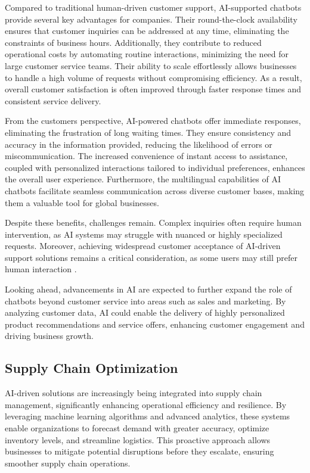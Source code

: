 Compared to traditional human-driven customer support, AI-supported chatbots provide several key advantages for companies. Their round-the-clock availability ensures that customer inquiries can be addressed at any time, eliminating the constraints of business hours. Additionally, they contribute to reduced operational costs by automating routine interactions, minimizing the need for large customer service teams. Their ability to scale effortlessly allows businesses to handle a high volume of requests without compromising efficiency. As a result, overall customer satisfaction is often improved through faster response times and consistent service delivery.  

From the customers perspective, AI-powered chatbots offer immediate responses, eliminating the frustration of long waiting times. They ensure consistency and accuracy in the information provided, reducing the likelihood of errors or miscommunication. The increased convenience of instant access to assistance, coupled with personalized interactions tailored to individual preferences, enhances the overall user experience. Furthermore, the multilingual capabilities of AI chatbots facilitate seamless communication across diverse customer bases, making them a valuable tool for global businesses.  

Despite these benefits, challenges remain. Complex inquiries often require human intervention, as AI systems may struggle with nuanced or highly specialized requests. Moreover, achieving widespread customer acceptance of AI-driven support solutions remains a critical consideration, as some users may still prefer human interaction \cite{Customer-Service-AI-Chatbots}.  

Looking ahead, advancements in AI are expected to further expand the role of chatbots beyond customer service into areas such as sales and marketing. By analyzing customer data, AI could enable the delivery of highly personalized product recommendations and service offers, enhancing customer engagement and driving business growth.


\subsection{Supply Chain Optimization}
\label{subsec:supply-chain-optimization}
AI-driven solutions are increasingly being integrated into supply chain management, significantly enhancing operational efficiency and resilience. By leveraging machine learning algorithms and advanced analytics, these systems enable organizations to forecast demand with greater accuracy, optimize inventory levels, and streamline logistics. This proactive approach allows businesses to mitigate potential disruptions before they escalate, ensuring smoother supply chain operations.


